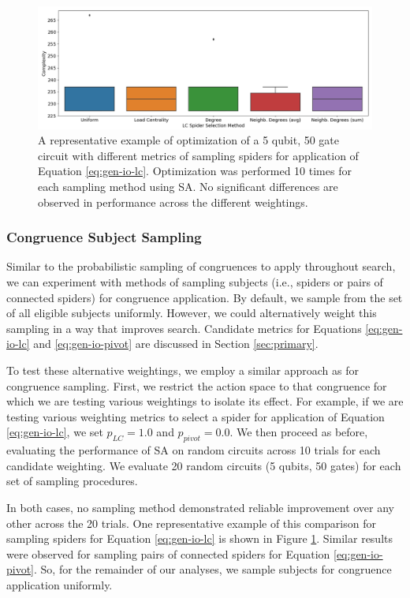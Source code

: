 \begin{figure}[t]
\centering
\includegraphics[width=13cm]{img/subj-sampling-ex.png}
\caption{
  A representative example of optimization of a 5 qubit, 50 gate circuit with different metrics of sampling spiders for application of Equation \ref{eq:gen-io-lc}.
  Optimization was performed 10 times for each sampling method using SA.
  No significant differences are observed in performance across the different weightings.
}
\label{fig:subj-sampling}
\end{figure}


\subsubsection*{Congruence Subject Sampling}

Similar to the probabilistic sampling of congruences to apply throughout search, we can experiment with methods of sampling subjects (i.e., spiders or pairs of connected spiders) for congruence application.
By default, we sample from the set of all eligible subjects uniformly.
However, we could alternatively weight this sampling in a way that improves search.
Candidate metrics for Equations \ref{eq:gen-io-lc} and \ref{eq:gen-io-pivot} are discussed in Section \ref{sec:primary}.

To test these alternative weightings, we employ a similar approach as for congruence sampling.
First, we restrict the action space to that congruence for which we are testing various weightings to isolate its effect.
For example, if we are testing various weighting metrics to select a spider for application of Equation \ref{eq:gen-io-lc}, we set $p_{LC} = 1.0$ and $p_{pivot} = 0.0$.
We then proceed as before, evaluating the performance of SA on random circuits across 10 trials for each candidate weighting.
We evaluate 20 random circuits (5 qubits, 50 gates) for each set of sampling procedures.

In both cases, no sampling method demonstrated reliable improvement over any other across the 20 trials.
One representative example of this comparison for sampling spiders for Equation \ref{eq:gen-io-lc} is shown in Figure \ref{fig:subj-sampling}.
Similar results were observed for sampling pairs of connected spiders for Equation \ref{eq:gen-io-pivot}.
So, for the remainder of our analyses, we sample subjects for congruence application uniformly.

